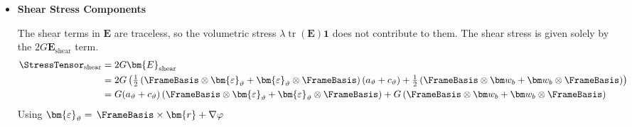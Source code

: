 \begin{itemize}
\textbf{$\mathbf{1}_\Section$ terms:}
From $\lambda \operatorname{tr}(\bm{E}) \mathbf{1}$:
\[
\lambda (\operatorname{tr}\bm{E}) \mathbf{1}_\Section = \left( \frac{E\nu}{1+\nu} (a_\varepsilon + \bm{r}\cdot\IesanLoadM) + \frac{E\nu(1-2x\nu)}{(1+\nu)(1-2\nu)}((\bm{r}-\CentroidLocation)\cdot\bm{b}_{\Section}) \right) \mathbf{1}_\Section
\]
From $2G \bm{E}_{\text{normal}}$ using $2G = E/(1+\nu)$:
\begin{align*}
2G \left( -\nu(a_\varepsilon + \bm{r}\cdot\IesanLoadM) - x\nu((\bm{r}-\CentroidLocation)\cdot\bm{b}_{\Section}) \right) \mathbf{1}_\Section
= -\frac{E\nu}{1+\nu} \left( (a_\varepsilon + \bm{r}\cdot\IesanLoadM) + x((\bm{r}-\CentroidLocation)\cdot\bm{b}_{\Section}) \right) \mathbf{1}_\Section
\end{align*}
%
Summing the $\mathbf{1}_\Section$ terms:

\item \textbf{Shear Stress Components}

The shear terms in $\bm{E}$ are traceless, so the volumetric stress $\lambda \operatorname{tr}(\bm{E}) \mathbf{1}$ does not contribute to them. The shear stress is given solely by the $2G \bm{E}_{\text{shear}}$ term.
$$
\begin{aligned}
\StressTensor_{\text{shear}} &= 2G \bm{E}_{\text{shear}} \\
&= 2G \left( \tfrac12\left(\FrameBasis\otimes\bm{\varepsilon}_{\vartheta}+\bm{\varepsilon}_{\vartheta}\otimes\FrameBasis\right)(a_\vartheta+c_\vartheta) + \tfrac12\left(\FrameBasis\otimes\bm w_b+\bm w_b\otimes\FrameBasis\right) \right) \\
&= G(a_\vartheta+c_\vartheta)\left(\FrameBasis\otimes\bm{\varepsilon}_{\vartheta}+\bm{\varepsilon}_{\vartheta}\otimes\FrameBasis\right) + G\left(\FrameBasis\otimes\bm w_b+\bm w_b\otimes\FrameBasis\right)
\end{aligned}
$$
Using $\bm{\varepsilon}_{\vartheta}= \,\FrameBasis\times\bm{r} +\nabla \varphi$

\end{itemize}

